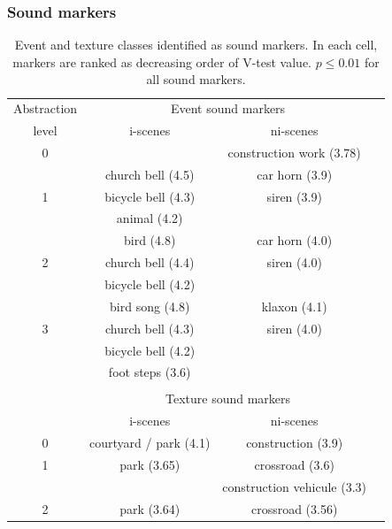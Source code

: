 \documentclass[12pt]{elsarticle}
\begin{document}
\subsubsection*{Sound markers}

\begin{table}[t]
 \setlength{\tabcolsep}{0.2pt}
 \centering
  {\renewcommand{\arraystretch}{0.9}
\begin{tabular}{c c c c}
Abstraction        & \multicolumn{2}{c}{Event sound markers} \\
level & i-scenes & ni-scenes \\
\hline
0  &                          & construction work (3.78)  \\
\hline
  & church bell  (4.5)             & car horn  (3.9) \\
1 & bicycle bell  (4.3)      & siren (3.9)\\
  & animal (4.2)              &       \\
   \hline
  & bird        (4.8)       & car horn  (4.0)\\
2 & church bell  (4.4)             & siren (4.0)\\
  & bicycle bell     (4.2)             &       \\
   \hline
  & bird song (4.8)        & klaxon  (4.1)\\
3 & church bell   (4.3)            & siren (4.0)\\
  & bicycle bell      (4.2)   &       \\
  & foot steps  (3.6)      &  \\
  &                           & \\
  & \multicolumn{2}{c}{Texture sound markers}      \\
  & i-scenes & ni-scenes \\
\hline
0 &     courtyard / park (4.1) &  construction (3.9)  \\
\hline
1 &     park (3.65)          &  crossroad (3.6)  \\
  &                          &  construction vehicule (3.3)  \\
\hline
2 &     park (3.64)          &  crossroad (3.56)  \\
\hline
\end{tabular}
}
\vspace{0.5mm}
\caption{Event and texture classes identified as sound markers. In each cell, markers are ranked as decreasing order of V-test value. $p\leq0.01$ for all sound markers.}
\label{tab:markers}
\end{table}
\end{document}
